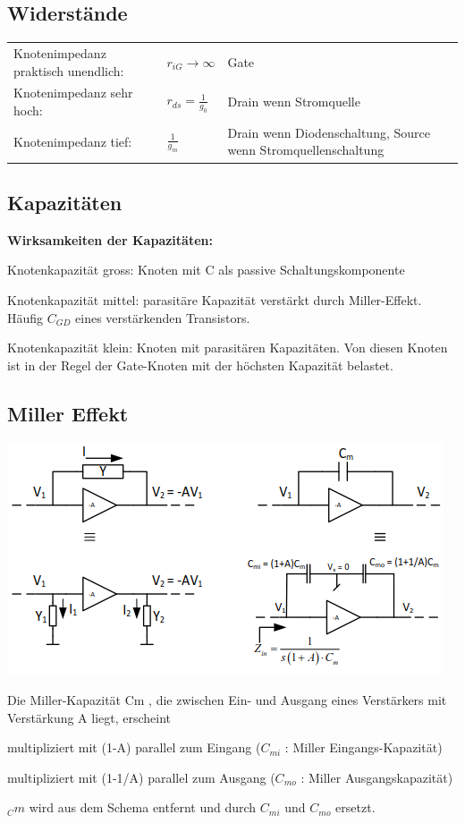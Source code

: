\subsection{Widerstände}
\begin{tabular}{lll}
	Knotenimpedanz praktisch unendlich: &$r_{iG}\rightarrow \infty$ & Gate \\
	Knotenimpedanz sehr hoch: &$r_{ds} = \frac{1}{g_0}$ & Drain wenn Stromquelle\\
	Knotenimpedanz tief: &$\frac{1}{g_m}$ & Drain wenn Diodenschaltung, Source wenn Stromquellenschaltung \\
\end{tabular}
\subsection{Kapazitäten}
\textbf{Wirksamkeiten der Kapazitäten:}
\begin{compactenum}
	\item Knotenkapazität gross: Knoten mit C als passive Schaltungskomponente
	\item Knotenkapazität mittel: parasitäre Kapazität verstärkt durch Miller-Effekt. Häufig $C_{GD}$ eines verstärkenden Transistors.
	\item Knotenkapazität klein: Knoten mit parasitären Kapazitäten. Von diesen Knoten ist in der Regel der Gate-Knoten mit der höchsten Kapazität belastet.
\end{compactenum}
\subsection{Miller Effekt}
\begin{minipage}[c]{0.5\textwidth}
	\includegraphics[width=1\linewidth]{chapters/Frequenzverhalten/images/miller}
\end{minipage}
\begin{minipage}[c]{0.5\textwidth}
	Die Miller-Kapazität Cm , die zwischen Ein- und Ausgang eines Verstärkers mit Verstärkung A liegt, erscheint
	\begin{compactitem}
		\item multipliziert mit (1-A) parallel zum Eingang ($C_{mi}$ : Miller Eingangs-Kapazität)
		\item multipliziert mit (1-1/A) parallel zum Ausgang ($C_{mo}$ : Miller Ausgangskapazität)
		\item $_Cm$ wird aus dem Schema entfernt und durch $C_{mi}$ und $C_{mo}$ ersetzt.
	\end{compactitem}
\end{minipage}
